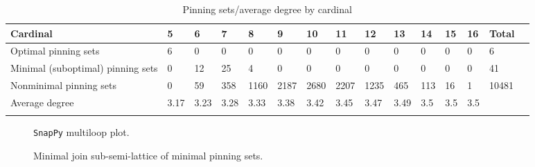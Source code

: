 \documentclass{article}%
\begin{document}
\begin{table}[ht]
	\caption{Pinning sets/average degree by cardinal}
	\centering
	\renewcommand{\arraystretch}{1.5}
	\begin{tabularx}{\textwidth}{lXXXXXXXXXXXXXX}
		\toprule
			Cardinal & 5 & 6 & 7 & 8 & 9 & 10 & 11 & 12 & 13 & 14 & 15 & 16 & Total\\
			\hline
			Optimal pinning sets & 6 & 0 & 0 & 0 & 0 & 0 & 0 & 0 & 0 & 0 & 0 & 0 & 6 \\
			Minimal (suboptimal) pinning sets & 0 & 12 & 25 & 4 & 0 & 0 & 0 & 0 & 0 & 0 & 0 & 0 & 41 \\
			Nonminimal pinning sets & 0 & 59 & 358 & 1160 & 2187 & 2680 & 2207 & 1235 & 465 & 113 & 16 & 1 & 10481 \\
			Average degree & 3.17 & 3.23 & 3.28 & 3.33 & 3.38 & 3.42 & 3.45 & 3.47 & 3.49 & 3.5 & 3.5 & 3.5 &  \\
		\bottomrule \\ 
	\end{tabularx}
\end{table}

\begin{multicols}{2}
\begin{figure}[H]
\centering

\caption{\texttt{SnapPy} multiloop plot.}
\label{fig:tex/img/[[8, 28, 1, 9], [9, 20, 10, 21], [17, 7, 18, 8], [18, 27, 19, 28], [1, 19, 2, 20], [10, 15, 11, 16], [21, 16, 22, 17], [22, 6, 23, 7], [26, 2, 27, 3], [14, 25, 15, 26], [11, 5, 12, 6], [23, 12, 24, 13.svg}
\end{figure}
\columnbreak

\begin{figure}[H]
\centering
\scalebox{0.8}{}
\caption{Minimal join sub-semi-lattice of minimal pinning sets.}
\label{fig:tex/img/[[8, 28, 1, 9], [9, 20, 10, 21], [17, 7, 18, 8], [18, 27, 19, 28], [1, 19, 2, 20], [10, 15, 11, 16], [21, 16, 22, 17], [22, 6, 23, 7], [26, 2, 27, 3], [14, 25, 15, 26], [11, 5, 12, 6], [23, 12, 24, 13.pgf}
\end{figure}
\end{multicols}
\end{document}
